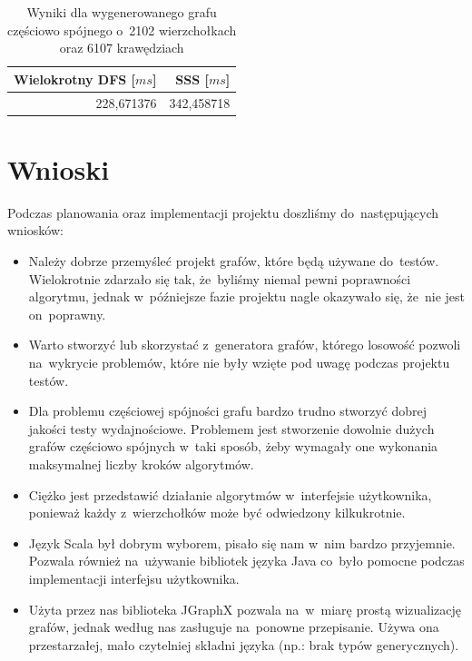 \documentclass[a4paper,12pt]{mwart}
\begin{document}
\begin{table}[H]
  \centering
  \begin{tabular}{ r r }
    Wielokrotny DFS [$ms$] & SSS [$ms$] \\
    \hline
    228,671376 & 342,458718 \\
  \end{tabular}
  \caption{Wyniki dla wygenerowanego grafu częściowo spójnego
    o~2102 wierzchołkach oraz 6107 krawędziach}
\end{table}

\section{Wnioski}

Podczas planowania oraz implementacji projektu doszliśmy do~następujących
wniosków:

\begin{itemize}
\item Należy dobrze przemyśleć projekt grafów, które będą używane do~testów.
  Wielokrotnie zdarzało się tak, że~byliśmy niemal pewni poprawności algorytmu,
  jednak w~późniejsze fazie projektu nagle okazywało się, że~nie jest
  on~poprawny.
\item Warto stworzyć lub skorzystać z~generatora grafów, którego losowość
  pozwoli na~wykrycie problemów, które nie były wzięte pod uwagę podczas
  projektu testów.
\item Dla problemu częściowej spójności grafu bardzo trudno stworzyć dobrej
  jakości testy wydajnościowe. Problemem jest stworzenie dowolnie dużych grafów
  częściowo spójnych w~taki sposób, żeby wymagały one wykonania maksymalnej
  liczby kroków algorytmów.
\item Ciężko jest przedstawić działanie algorytmów w~interfejsie użytkownika,
  ponieważ każdy z~wierzchołków może być odwiedzony kilkukrotnie.
\item Język Scala był dobrym wyborem, pisało się nam w~nim bardzo przyjemnie.
  Pozwala również na~używanie bibliotek języka Java co~było pomocne podczas
  implementacji interfejsu użytkownika.
\item Użyta przez nas biblioteka JGraphX pozwala na~w~miarę prostą wizualizację
  grafów, jednak według nas zasługuje na~ponowne przepisanie. Używa ona
  przestarzałej, mało czytelniej składni języka (np.: brak typów generycznych).
\end{itemize}
\end{document}
